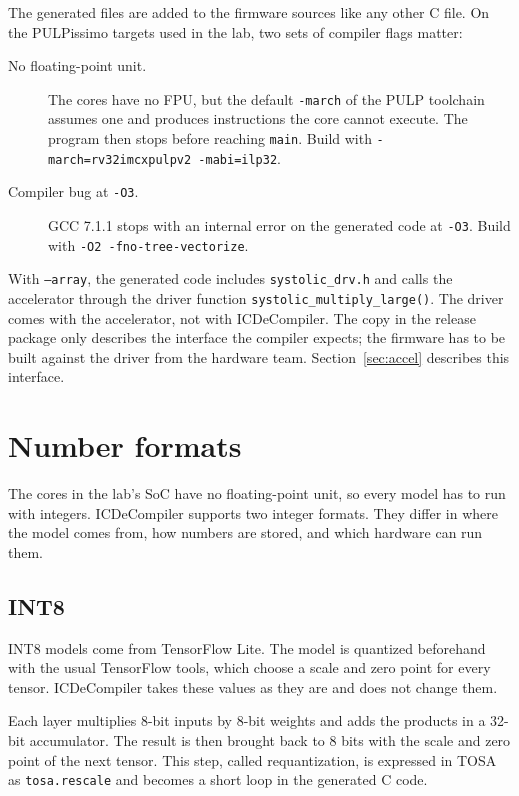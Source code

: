 \documentclass[11pt,a4paper]{article}
\begin{document}
The generated files are added to the firmware sources like any other C file.
On the PULPissimo targets used in the lab, two sets of compiler flags matter:

\begin{description}
  \item[No floating-point unit.] The cores have no FPU, but the default
    \texttt{-march} of the PULP toolchain assumes one and produces
    instructions the core cannot execute. The program then stops before
    reaching \texttt{main}. Build with
    \texttt{-march=rv32imcxpulpv2 -mabi=ilp32}.
  \item[Compiler bug at \texttt{-O3}.] GCC 7.1.1 stops with an internal error
    on the generated code at \texttt{-O3}. Build with
    \texttt{-O2 -fno-tree-vectorize}.
\end{description}

With \texttt{--array}, the generated code includes \texttt{systolic\_drv.h}
and calls the accelerator through the driver function
\texttt{systolic\_multiply\_large()}. The driver comes with the accelerator,
not with ICDeCompiler. The copy in the release package only describes the
interface the compiler expects; the firmware has to be built against the
driver from the hardware team. Section~\ref{sec:accel} describes this
interface.

\section{Number formats}
\label{sec:formats}

The cores in the lab's SoC have no floating-point unit, so every model has to run with integers. ICDeCompiler supports two integer formats. They differ in where the model comes from, how numbers are stored, and which hardware can run them.

\subsection{INT8}

INT8 models come from TensorFlow Lite. The model is quantized beforehand with the usual TensorFlow tools, which choose a scale and zero point for every tensor. ICDeCompiler takes these values as they are and does not change them.

Each layer multiplies 8-bit inputs by 8-bit weights and adds the products in a 32-bit accumulator. The result is then brought back to 8 bits with the scale and zero point of the next tensor. This step, called requantization, is expressed in TOSA as \texttt{tosa.rescale} and becomes a short loop in the generated C code.
\end{document}
